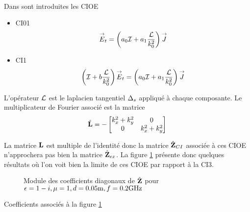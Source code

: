       Dans \cite{stupfel_implementation_2015} sont introduites les CIOE
      \begin{itemize}
        \item CI01
          \begin{equation*}
            {\overset{\rightarrow}{E}}_t = \left(a_0{\mathcal{I}} + a_1\dfrac{\mathcal{L}}{k_0^2}\right){\overset{\rightarrow}{J}}
          \end{equation*}
        \item CI1
          \begin{equation*}
            \left({\mathcal{I}} + b\dfrac{\mathcal{L}}{k_0^2} \right){\overset{\rightarrow}{E}}_t = \left(a_0{\mathcal{I}} + a_1\dfrac{\mathcal{L}}{k_0^2}\right){\overset{\rightarrow}{J}}
          \end{equation*}
      \end{itemize}

      L'opérateur \(\mathcal{L}\) est le laplacien tangentiel \(\Delta_s\) appliqué à chaque composante. Le multiplicateur de Fourier associé est la matrice
      \begin{equation*}
        \hat{\mathbf{L}}  = -
        \begin{bmatrix}
          k_x^2 + k_y^2 & 0
          \\
          0 & k_x^2 + k_y^2
        \end{bmatrix}
      \end{equation*}

      La matrice \(\mathbf{L}\) est multiple de l'identité donc la matrice \(\hat{\mathbf{Z}}_{CI}\) associée à ces CIOE n'approchera pas bien la matrice \(\hat{\mathbf{Z}}_{ex}\). La figure \ref{fig:imp_fourier:plan:stupfel:hoibc} présente donc quelques résultats où l'on voit bien la limite de ces CIOE par rapport à la CI3.
      \begin{figure}[!hbt]
        \centering
        
        \caption[CIOE sur empilement de B.~Stupfel p.~1661]{Module des coefficients diagonaux de \(\hat{\mathbf{Z}}\) pour \(\epsilon = 1-i, \mu = 1, d=0.05\text{m}, f=0.2\text{GHz}\)}
        \label{fig:imp_fourier:plan:stupfel:hoibc}
      \end{figure}
      \begin{table}[!hbt]
        \centering

        \caption{Coefficients associés à la figure \ref{fig:imp_fourier:plan:stupfel:hoibc}}
        \label{tab:imp_fourier:plan:stupfel:hoibc}
      \end{table}
      
